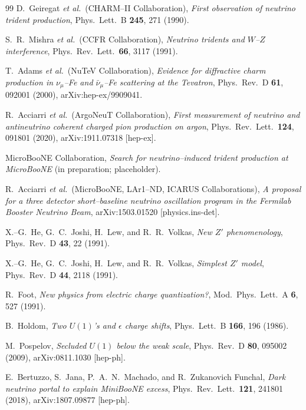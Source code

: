 \begin{thebibliography}{99}
D.~Geiregat \emph{et al.}\ (CHARM--II Collaboration),
\emph{First observation of neutrino trident production},
Phys.\ Lett.\ B \textbf{245}, 271 (1990).

S.~R.~Mishra \emph{et al.}\ (CCFR Collaboration),
\emph{Neutrino tridents and $W$--$Z$ interference},
Phys.\ Rev.\ Lett.\ \textbf{66}, 3117 (1991).

T.~Adams \emph{et al.}\ (NuTeV Collaboration),
\emph{Evidence for diffractive charm production in
$\nu_\mu$--Fe and $\bar\nu_\mu$--Fe scattering at the Tevatron},
Phys.\ Rev.\ D \textbf{61}, 092001 (2000),
arXiv:hep-ex/9909041.

R.~Acciarri \emph{et al.}\ (ArgoNeuT Collaboration),
\emph{First measurement of neutrino and antineutrino coherent charged
pion production on argon},
Phys.\ Rev.\ Lett.\ \textbf{124}, 091801 (2020),
arXiv:1911.07318 [hep-ex].

MicroBooNE Collaboration, \emph{Search for neutrino--induced trident
production at MicroBooNE} (in preparation; placeholder).

R.~Acciarri \emph{et al.}\ (MicroBooNE, LAr1--ND, ICARUS Collaborations),
\emph{A proposal for a three detector short--baseline neutrino
oscillation program in the Fermilab Booster Neutrino Beam},
arXiv:1503.01520 [physics.ins-det].

X.--G.~He, G.~C.~Joshi, H.~Lew, and R.~R.~Volkas,
\emph{New $Z'$ phenomenology},
Phys.\ Rev.\ D \textbf{43}, 22 (1991).

X.--G.~He, G.~C.~Joshi, H.~Lew, and R.~R.~Volkas,
\emph{Simplest $Z'$ model},
Phys.\ Rev.\ D \textbf{44}, 2118 (1991).

R.~Foot,
\emph{New physics from electric charge quantization?},
Mod.\ Phys.\ Lett.\ A \textbf{6}, 527 (1991).

B.~Holdom,
\emph{Two $U(1)$'s and $\epsilon$ charge shifts},
Phys.\ Lett.\ B \textbf{166}, 196 (1986).

M.~Pospelov,
\emph{Secluded $U(1)$ below the weak scale},
Phys.\ Rev.\ D \textbf{80}, 095002 (2009),
arXiv:0811.1030 [hep-ph].

E.~Bertuzzo, S.~Jana, P.~A.~N.~Machado, and R.~Zukanovich Funchal,
\emph{Dark neutrino portal to explain MiniBooNE excess},
Phys.\ Rev.\ Lett.\ \textbf{121}, 241801 (2018),
arXiv:1807.09877 [hep-ph].


\end{thebibliography}
